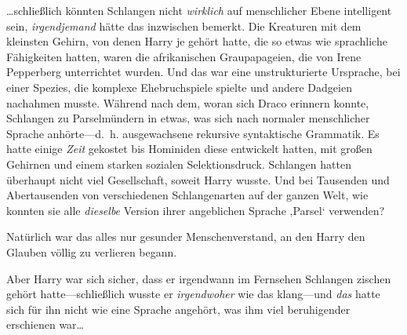 …schließlich könnten Schlangen nicht \emph{wirklich} auf menschlicher Ebene intelligent sein, \emph{irgendjemand} hätte das inzwischen bemerkt. Die Kreaturen mit dem kleinsten Gehirn, von denen Harry je gehört hatte, die so etwas wie sprachliche Fähigkeiten hatten, waren die afrikanischen Graupapageien, die von Irene Pepperberg unterrichtet wurden. Und das war eine unstrukturierte Ursprache, bei einer Spezies, die komplexe Ehebruchspiele spielte und andere Dadgeien nachahmen musste. Während nach dem, woran sich Draco erinnern konnte, Schlangen zu Parselmündern in etwas, was sich nach normaler menschlicher Sprache anhörte—d.~h. ausgewachsene rekursive syntaktische Grammatik. Es hatte einige \emph{Zeit} gekostet bis Hominiden diese entwickelt hatten, mit großen Gehirnen und einem starken sozialen Selektionsdruck. Schlangen hatten überhaupt nicht viel Gesellschaft, soweit Harry wusste. Und bei Tausenden und Abertausenden von verschiedenen Schlangenarten auf der ganzen Welt, wie konnten sie alle \emph{dieselbe} Version ihrer angeblichen Sprache ‚Parsel‘ verwenden?

Natürlich war das alles nur gesunder Menschenverstand, an den Harry den Glauben völlig zu verlieren begann.

Aber Harry war sich sicher, dass er irgendwann im Fernsehen Schlangen zischen gehört hatte—schließlich wusste er \emph{irgendwoher} wie das klang—und \emph{das} hatte sich für ihn nicht wie eine Sprache angehört, was ihm viel beruhigender erschienen war…

